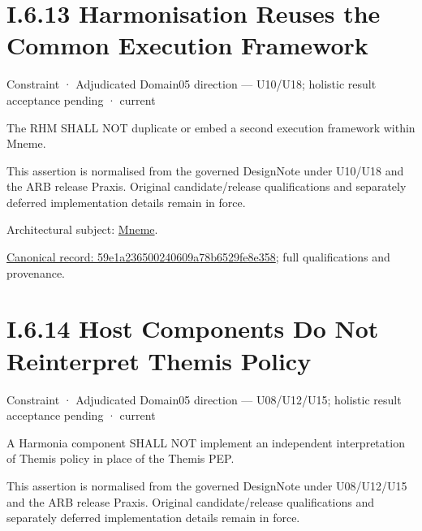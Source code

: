 \section*{I.6.13 Harmonisation Reuses the Common Execution Framework}
\label{navigation:I.6.13}

\label{element:59e1a236500240609a78b6529fe8e358}
{\small Constraint · Adjudicated Domain05 direction — U10/U18; holistic result acceptance pending · current}\par

The RHM SHALL NOT duplicate or embed a second execution framework within Mneme.



This assertion is normalised from the governed DesignNote under U10/U18 and the ARB release Praxis. Original candidate/release qualifications and separately deferred implementation details remain in force.



Architectural subject: \hyperref[element:1af8a56358f7429fabfb57be66542a99]{Mneme}.


{\footnotesize \href{../../../../continuum/motivation/constraint/59e1a236500240609a78b6529fe8e358.md}{Canonical record: 59e1a236500240609a78b6529fe8e358}; full qualifications and provenance.}\par
\section*{I.6.14 Host Components Do Not Reinterpret Themis Policy}
\label{navigation:I.6.14}

\label{element:80e5d019948b4c16acb510547d7a3ac6}
{\small Constraint · Adjudicated Domain05 direction — U08/U12/U15; holistic result acceptance pending · current}\par

A Harmonia component SHALL NOT implement an independent interpretation of Themis policy in place of the Themis PEP.



This assertion is normalised from the governed DesignNote under U08/U12/U15 and the ARB release Praxis. Original candidate/release qualifications and separately deferred implementation details remain in force.




